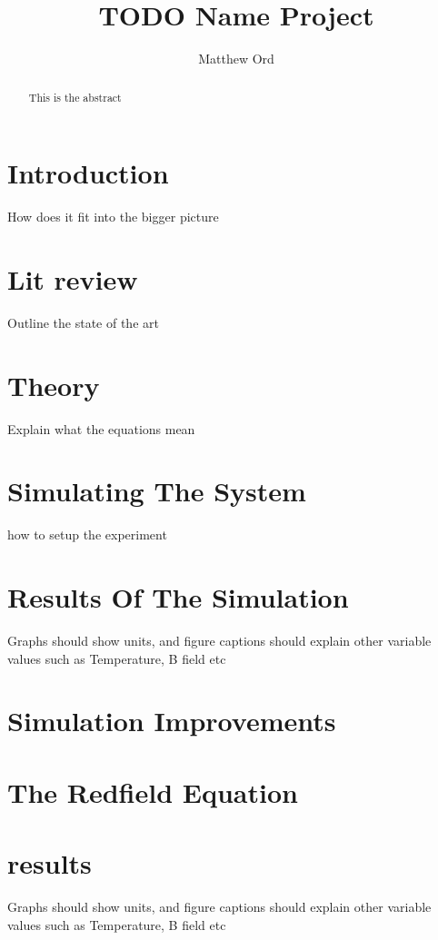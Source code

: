 \documentclass{article}
\title{TODO Name Project}
\author{Matthew Ord}
\date{}
\begin{document}
\maketitle

\begin{abstract}
    This is the abstract
\end{abstract}



\pagebreak
\section{Introduction}

How does it fit into the bigger picture


\section{Lit review}
Outline the state of the art

\section{Theory}\label{sec:the model}
Explain what the equations mean


\section{Simulating The System}\label{sec:simulation}
how to setup the experiment


\section{Results Of The Simulation}\label{sec:simulation results}
Graphs should show units, and figure captions should explain other variable values such as Temperature, B
field etc

\section{Simulation Improvements}



\section{The Redfield Equation}\label{sec:redfield}


\section{results}
Graphs should show units, and figure captions should explain other variable values such as Temperature, B
field etc
\end{document}
